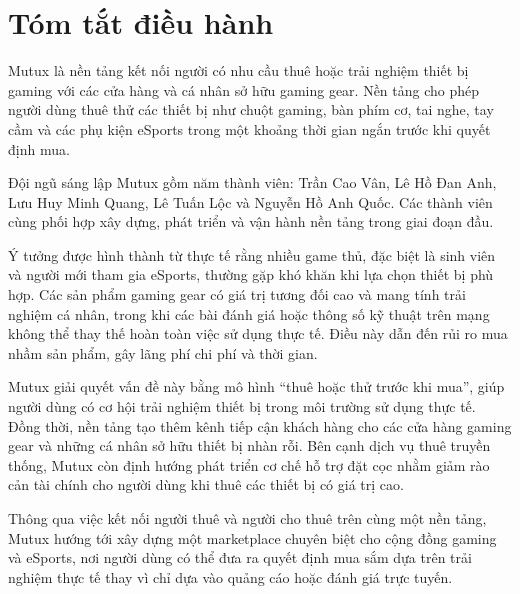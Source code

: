 \section{Tóm tắt điều hành}



Mutux là nền tảng kết nối người có nhu cầu thuê hoặc trải nghiệm thiết bị gaming với các cửa hàng và cá nhân sở hữu gaming gear. Nền tảng cho phép người dùng thuê thử các thiết bị như chuột gaming, bàn phím cơ, tai nghe, tay cầm và các phụ kiện eSports trong một khoảng thời gian ngắn trước khi quyết định mua.

Đội ngũ sáng lập Mutux gồm năm thành viên: Trần Cao Vân, Lê Hồ Đan Anh, Lưu Huy Minh Quang, Lê Tuấn Lộc và Nguyễn Hồ Anh Quốc. Các thành viên cùng phối hợp xây dựng, phát triển và vận hành nền tảng trong giai đoạn đầu.

Ý tưởng được hình thành từ thực tế rằng nhiều game thủ, đặc biệt là sinh viên và người mới tham gia eSports, thường gặp khó khăn khi lựa chọn thiết bị phù hợp. Các sản phẩm gaming gear có giá trị tương đối cao và mang tính trải nghiệm cá nhân, trong khi các bài đánh giá hoặc thông số kỹ thuật trên mạng không thể thay thế hoàn toàn việc sử dụng thực tế. Điều này dẫn đến rủi ro mua nhầm sản phẩm, gây lãng phí chi phí và thời gian.

Mutux giải quyết vấn đề này bằng mô hình “thuê hoặc thử trước khi mua”, giúp người dùng có cơ hội trải nghiệm thiết bị trong môi trường sử dụng thực tế. Đồng thời, nền tảng tạo thêm kênh tiếp cận khách hàng cho các cửa hàng gaming gear và những cá nhân sở hữu thiết bị nhàn rỗi. Bên cạnh dịch vụ thuê truyền thống, Mutux còn định hướng phát triển cơ chế hỗ trợ đặt cọc nhằm giảm rào cản tài chính cho người dùng khi thuê các thiết bị có giá trị cao.

Thông qua việc kết nối người thuê và người cho thuê trên cùng một nền tảng, Mutux hướng tới xây dựng một marketplace chuyên biệt cho cộng đồng gaming và eSports, nơi người dùng có thể đưa ra quyết định mua sắm dựa trên trải nghiệm thực tế thay vì chỉ dựa vào quảng cáo hoặc đánh giá trực tuyến.


